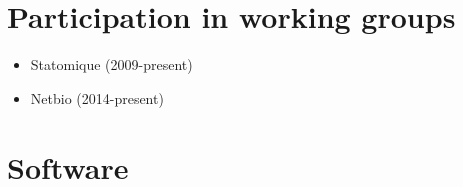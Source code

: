 \documentclass[11pt, a4paper]{awesome-cv}
\providecommand{\tightlist}{%
	\setlength{\itemsep}{0pt}\setlength{\parskip}{0pt}}
\begin{document}
\hypertarget{participation-in-working-groups}{%
\section{Participation in working
groups}\label{participation-in-working-groups}}

\begin{itemize}
\tightlist
\item
  Statomique (2009-present)
\item
  Netbio (2014-present)
\end{itemize}

\hypertarget{software}{%
\section{Software}\label{software}}
\end{document}
